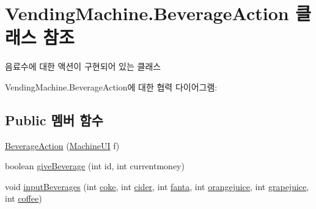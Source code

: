 \hypertarget{class_vending_machine_1_1_beverage_action}{}\section{Vending\+Machine.\+Beverage\+Action 클래스 참조}
\label{class_vending_machine_1_1_beverage_action}


음료수에 대한 액션이 구현되어 있는 클래스  




Vending\+Machine.\+Beverage\+Action에 대한 협력 다이어그램\+:
\subsection*{Public 멤버 함수}
\begin{DoxyCompactItemize}
\item 
\hyperlink{class_vending_machine_1_1_beverage_action_a676b3cd342699f9554ffab80d0783e9d}{Beverage\+Action} (\hyperlink{class_vending_machine_1_1_machine_u_i}{Machine\+UI} f)
\item 
boolean \hyperlink{class_vending_machine_1_1_beverage_action_a2873745e33c3ab5248812d4a8dc01e3f}{give\+Beverage} (int id, int currentmoney)
\item 
void \hyperlink{class_vending_machine_1_1_beverage_action_a22235582a7aa3f1f6797634484617dfd}{input\+Beverages} (int \hyperlink{class_vending_machine_1_1_beverage_action_a3ccaf8736a20aea9cc84aa5c525fca35}{coke}, int \hyperlink{class_vending_machine_1_1_beverage_action_a7d3d1173a06502e63ec77d8297f7eaca}{cider}, int \hyperlink{class_vending_machine_1_1_beverage_action_a49ca1e1fc03f8d685e11e66734e3a29e}{fanta}, int \hyperlink{class_vending_machine_1_1_beverage_action_aecab78a26d86ba8dd679e5dda12ccc89}{orangejuice}, int \hyperlink{class_vending_machine_1_1_beverage_action_ad57bdbeb988807b0fb47fd148352930c}{grapejuice}, int \hyperlink{class_vending_machine_1_1_beverage_action_aa109f67c225357d2ab44e3b1cb6be6e8}{coffee})
\end{DoxyCompactItemize}

